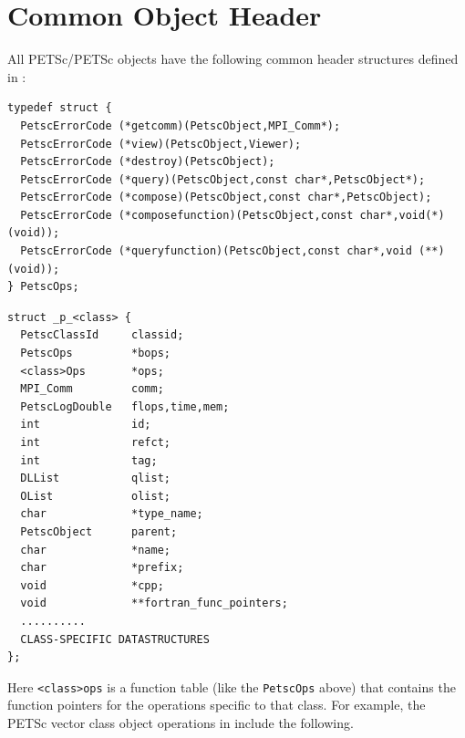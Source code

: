\section{Common Object Header}

All PETSc/PETSc objects have the following common header structures
defined in \href{http://www.mcs.anl.gov/petsc/petsc-master/include/petsc/private/petscimpl.h.html}{}:

\begin{lstlisting}[caption=Function table common to all PETSc-compatible classes]
typedef struct {
  PetscErrorCode (*getcomm)(PetscObject,MPI_Comm*);
  PetscErrorCode (*view)(PetscObject,Viewer);
  PetscErrorCode (*destroy)(PetscObject);
  PetscErrorCode (*query)(PetscObject,const char*,PetscObject*);
  PetscErrorCode (*compose)(PetscObject,const char*,PetscObject);
  PetscErrorCode (*composefunction)(PetscObject,const char*,void(*)(void));
  PetscErrorCode (*queryfunction)(PetscObject,const char*,void (**)(void));
} PetscOps;
\end{lstlisting}
\begin{lstlisting}[caption=Data structure header common to all PETSc-compatible classes]
struct _p_<class> {
  PetscClassId     classid;
  PetscOps         *bops;
  <class>Ops       *ops;
  MPI_Comm         comm;
  PetscLogDouble   flops,time,mem;
  int              id;
  int              refct;
  int              tag;
  DLList           qlist;
  OList            olist;
  char             *type_name;
  PetscObject      parent;
  char             *name;
  char             *prefix;
  void             *cpp;
  void             **fortran_func_pointers;
  ..........
  CLASS-SPECIFIC DATASTRUCTURES
};
\end{lstlisting}
Here \lstinline{<class>ops} is a function table (like the \lstinline{PetscOps} above) that
contains the function pointers for the operations specific to that class.
For example, the PETSc vector class object operations in \href{http://www.mcs.anl.gov/petsc/petsc-master/include/petsc/private/vecimple.h.html}{} include the following.

